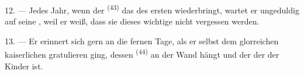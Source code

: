 12. --- Jedes Jahr, wenn der  \textsuperscript{(43)} das
 des ersten  wiederbringt, wartet er ungeduldig auf
seine , weil er weiß, dass sie dieses wichtige 
nicht vergessen werden.

13. --- Er erinnert sich gern an die fernen Tage, als er selbst dem glorreichen
kaiserlichen  gratulieren ging, dessen 
\textsuperscript{(44)} an der Wand hängt und der der  der Kinder
ist.
\VUsaut{6.0mm}
\VUfilet{22mm}
